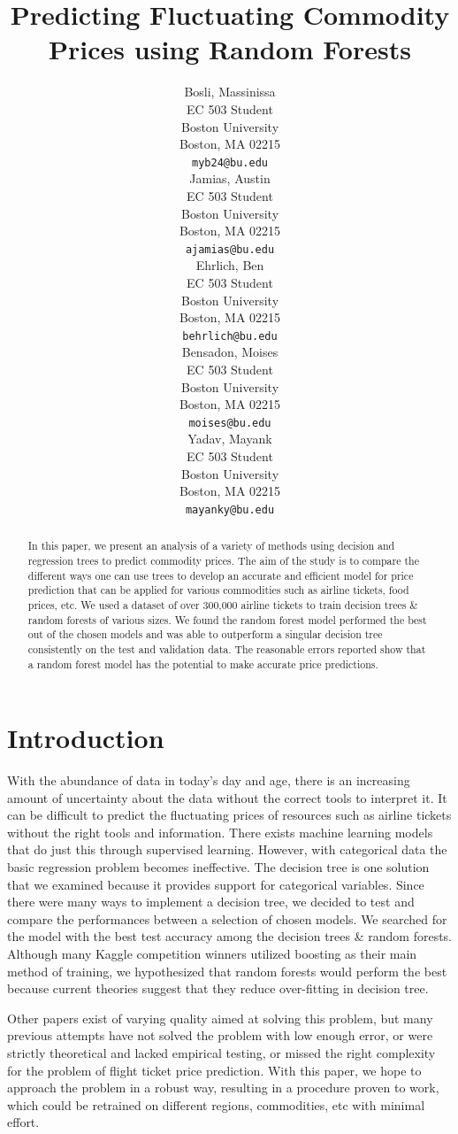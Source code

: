 \documentclass{article}
\title{Predicting Fluctuating Commodity Prices using Random Forests}
\author{
  Bosli, Massinissa \\
  EC 503 Student\\
  Boston University\\
  Boston, MA 02215 \\
  \texttt{myb24@bu.edu} \\
  \And
  Jamias, Austin \\
  EC 503 Student\\
  Boston University\\
  Boston, MA 02215 \\
  \texttt{ajamias@bu.edu} \\
  \AND
  Ehrlich, Ben \\
  EC 503 Student\\
  Boston University\\
  Boston, MA 02215 \\
  \texttt{behrlich@bu.edu} \\
  \And
  Bensadon, Moises \\
  EC 503 Student\\
  Boston University\\
  Boston, MA 02215 \\
  \texttt{moises@bu.edu} \\
  \And
  Yadav, Mayank \\
  EC 503 Student\\
  Boston University\\
  Boston, MA 02215 \\
  \texttt{mayanky@bu.edu} \\
}
\begin{document}
\maketitle


\begin{abstract}
In this paper, we present an analysis of a variety of methods using decision and regression trees to predict commodity prices. The aim of the study is to compare the different ways one can use trees to develop an accurate and efficient model for price prediction that can be applied for various commodities such as airline tickets, food prices, etc. We used a dataset of over 300,000 airline tickets to train decision trees \& random forests of various sizes. We found the random forest model performed the best out of the chosen models and was able to outperform a singular decision tree consistently on the test and validation data. The reasonable errors reported show that a random forest model has the potential to make accurate price predictions.
\end{abstract}


\section{Introduction}

With the abundance of data in today's day and age, there is an increasing amount of uncertainty about the data without the correct tools to interpret it. It can be difficult to predict the fluctuating prices of resources such as airline tickets without the right tools and information. There exists machine learning models that do just this through supervised learning. However, with categorical data the basic regression problem becomes ineffective. The decision tree is one solution that we examined because it provides support for categorical variables. Since there were many ways to implement a decision tree, we decided to test and compare the performances between a selection of chosen models. We searched for the model with the best test accuracy among the decision trees \& random forests. Although many Kaggle competition winners utilized boosting as their main method of training, we hypothesized that random forests would perform the best because current theories suggest that they reduce over-fitting in decision tree. 

Other papers exist of varying quality aimed at solving this problem, but many previous attempts have not solved the problem with low enough error, or were strictly theoretical and lacked empirical testing, or missed the right complexity for the problem of flight ticket price prediction. With this paper, we hope to approach the problem in a robust way, resulting in a procedure proven to work, which could be retrained on different regions, commodities, etc with minimal effort.
\end{document}
